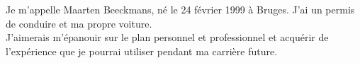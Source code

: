 \documentclass[9pt]{developercv} %
\begin{document}


\begin{minipage}[t]{0.4\textwidth} %
	\vspace{-\baselineskip} %
	
	Je m'appelle Maarten Beeckmans, né le 24 f\'{e}vrier 1999 à Bruges. J'ai un permis de conduire et ma propre voiture.\\ 
	J'aimerais m'\'{e}panouir sur le plan personnel et professionnel et acqu\'{e}rir de l'exp\'{e}rience que je pourrai utiliser pendant ma carri\`{e}re future.
\end{minipage}
\hfill %
\begin{minipage}[t]{0.5\textwidth} %
	\vspace{-\baselineskip} %
	\begin{barchart}{5.5}
	\end{barchart}
\end{minipage}


\end{document}
